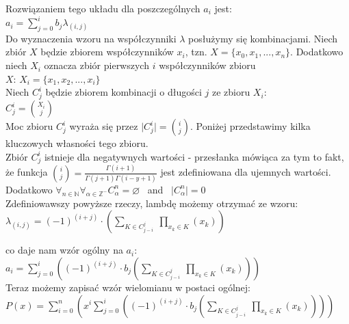 \documentclass[a4paper,12pt]{article}
\newcommand{\id}{\noindent}
\newcommand{\el}[2]{\lambda_{(#1, #2)}}
\newcommand{\fa}[1]{\displaystyle\mathop{\forall}_{#1}}
\begin{document}
\id
Rozwiązaniem tego układu dla poszczególnych $a_i$ jest: \\

$a_i = \sum\limits_{j=0}^{i}b_j\el{i}{j}$ \\

\id
Do wyznaczenia wzoru na współczynniki $\lambda$ posłużymy się kombinacjami. Niech zbiór $X$ będzie zbiorem współczynników $x_i$, tzn. $X = \{ x_0, x_1, ... , x_n\}$. Dodatkowo niech $X_i$ oznacza zbiór pierwszych $i$ współczynników zbioru \\ $X$: $X_i = \{x_1, x_2, ..., x_i \}$ \\

\id
Niech $C_j^i$ będzie zbiorem kombinacji o długości $j$ ze zbioru $X_i$: \\

$C_j^i = \binom{X_i}{j}$ \\

\id
Moc zbioru $C_j^i$ wyraża się przez $\vert C_j^i\vert = \binom{i}{j}$. Poniżej przedstawimy kilka kluczowych własności tego zbioru. \\

\id
Zbiór $C_j^i$ istnieje dla negatywnych wartości - przesłanka mówiąca za tym to fakt, że funkcja $\binom{i}{j} = \frac{\Gamma (i+1)}{\Gamma (j+1) \Gamma (i-y+1 )}$ jest zdefiniowana dla ujemnych wartości. \\

\id
Dodatkowo $\fa{ n\in \mathbb{N}}\fa{\alpha \in \mathbb{Z}^{-}}C^n_\alpha = \varnothing$ \ and \ $\vert C_\alpha^n\vert = 0$ \\

\id
Zdefiniowawszy powyższe rzeczy, lambdę możemy otrzymać ze wzoru: \\

$\el{i}{j} = (-1)^{(i+j)}\cdot \left( \sum\limits_{K \in C^j_{j-i}} \ \prod\limits_{x_k \in K} \left( x_k \right) \right)$ \\

\newpage

\id
co daje nam wzór ogólny na $a_i$: \\

$a_i = \sum\limits_{j=0}^{i} \left( (-1)^{(i+j)}\cdot b_j\left( \sum\limits_{K \in C^j_{j-i}} \ \prod\limits_{x_k \in K} \left( x_k \right) \right) \right)$ \\

\id
Teraz możemy zapisać wzór wielomianu w postaci ogólnej: \\

$P(x) = \sum\limits_{i=0}^{n} \left( x^i\sum\limits_{j=0}^{i} \left( (-1)^{(i+j)}\cdot b_j\left( \sum\limits_{K \in C^j_{j-i}} \ \prod\limits_{x_k \in K} \left( x_k \right) \right) \right) \right)$ \\
\end{document}
